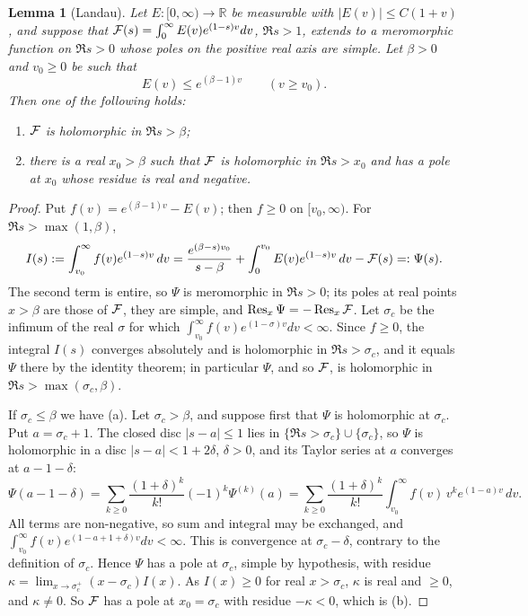 \documentclass[10pt]{amsart}
\newtheorem{lemma}[theorem]{Lemma}
\theoremstyle{definition}
\theoremstyle{remark}
\begin{document}
\begin{lemma}[Landau]\label{an:lem-landau}
Let $E\colon[0,\infty)\to\mathbb R$ be measurable with $|E(v)|\le C(1+v)$, and
suppose that $\mathcal F(s)=\int_0^\infty E(v)e^{(1-s)v}dv$, $\Re s>1$, extends to a
meromorphic function on $\Re s>0$ whose poles on the positive real axis are
simple. Let $\beta>0$ and $v_0\ge0$ be such that
\[
 E(v)\le e^{(\beta-1)v}\qquad(v\ge v_0).
\]
Then one of the following holds:
\begin{enumerate}
\item[(a)] $\mathcal F$ is holomorphic in $\Re s>\beta$;
\item[(b)] there is a real $x_0>\beta$ such that $\mathcal F$ is holomorphic in
$\Re s>x_0$ and has a pole at $x_0$ whose residue is real and negative.
\end{enumerate}
\end{lemma}
\begin{proof}
Put $f(v)=e^{(\beta-1)v}-E(v)$; then $f\ge0$ on $[v_0,\infty)$. For
$\Re s>\max(1,\beta)$,
\[
 I(s):=\int_{v_0}^\infty f(v)e^{(1-s)v}\,dv=\frac{e^{(\beta-s)v_0}}{s-\beta}+\int_0^{v_0}E(v)e^{(1-s)v}\,dv-\mathcal F(s)=:\Psi(s).
\]
The second term is entire, so $\Psi$ is meromorphic in $\Re s>0$; its poles
at real points $x>\beta$ are those of $\mathcal F$, they are simple, and
$\operatorname{Res}_{x}\Psi=-\operatorname{Res}_{x}\mathcal F$. Let $\sigma_c$ be
the infimum of the real $\sigma$ for which
$\int_{v_0}^\infty f(v)e^{(1-\sigma)v}dv<\infty$. Since $f\ge0$, the integral
$I(s)$ converges absolutely and is holomorphic in $\Re s>\sigma_c$, and it
equals $\Psi$ there by the identity theorem; in particular $\Psi$, and so
$\mathcal F$, is holomorphic in $\Re s>\max(\sigma_c,\beta)$.

If $\sigma_c\le\beta$ we have (a). Let $\sigma_c>\beta$, and suppose first
that $\Psi$ is holomorphic at $\sigma_c$. Put $a=\sigma_c+1$. The closed disc
$|s-a|\le1$ lies in $\{\Re s>\sigma_c\}\cup\{\sigma_c\}$, so $\Psi$ is
holomorphic in a disc $|s-a|<1+2\delta$, $\delta>0$, and its Taylor series
at $a$ converges at $a-1-\delta$:
\[
 \Psi(a-1-\delta)=\sum_{k\ge0}\frac{(1+\delta)^k}{k!}(-1)^k\Psi^{(k)}(a)
 =\sum_{k\ge0}\frac{(1+\delta)^k}{k!}\int_{v_0}^\infty f(v)\,v^{k}e^{(1-a)v}\,dv .
\]
All terms are non-negative, so sum and integral may be exchanged, and
$\int_{v_0}^\infty f(v)e^{(1-a+1+\delta)v}dv<\infty$. This is convergence at
$\sigma_c-\delta$, contrary to the definition of $\sigma_c$. Hence $\Psi$
has a pole at $\sigma_c$, simple by hypothesis, with residue
$\kappa=\lim_{x\to\sigma_c^+}(x-\sigma_c)I(x)$. As $I(x)\ge0$ for real
$x>\sigma_c$, $\kappa$ is real and $\ge0$, and $\kappa\ne0$. So $\mathcal F$ has a
pole at $x_0=\sigma_c$ with residue $-\kappa<0$, which is (b).
\end{proof}
\end{document}
